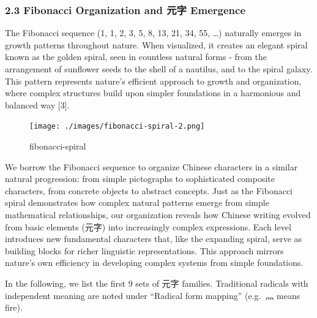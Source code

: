 \documentclass[
  11pt,
  letterpaper,
]{article}
\begin{document}
\hypertarget{fibonacci-organization-and-ux5143ux5b57-emergence}{%
\subsubsection{2.3 Fibonacci Organization and 元字
Emergence}\label{fibonacci-organization-and-ux5143ux5b57-emergence}}

The Fibonacci sequence (1, 1, 2, 3, 5, 8, 13, 21, 34, 55, \ldots)
naturally emerges in growth patterns throughout nature. When visualized,
it creates an elegant spiral known as the golden spiral, seen in
countless natural forms - from the arrangement of sunflower seeds to the
shell of a nautilus, and to the spiral galaxy. This pattern represents
nature's efficient approach to growth and organization, where complex
structures build upon simpler foundations in a harmonious and balanced
way {[}3{]}.

\begin{figure}
\centering
\texttt{[image: ./images/fibonacci-spiral-2.png]}
\caption{fibonacci-spiral}
\end{figure}

We borrow the Fibonacci sequence to organize Chinese characters in a
similar natural progression: from simple pictographs to sophisticated
composite characters, from concrete objects to abstract concepts. Just
as the Fibonacci spiral demonstrates how complex natural patterns emerge
from simple mathematical relationships, our organization reveals how
Chinese writing evolved from basic elements (元字) into increasingly
complex expressions. Each level introduces new fundamental characters
that, like the expanding spiral, serve as building blocks for richer
linguistic representations. This approach mirrors nature's own
efficiency in developing complex systems from simple foundations.

In the following, we list the first 9 sets of 元字 families. Traditional
radicals with independent meaning are noted under ``Radical form
mapping'' (e.g.~灬 means fire).
\end{document}

